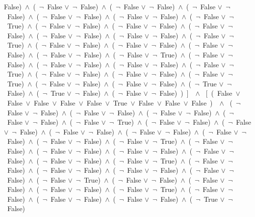 ﻿\documentclass[a4paper,10pt]{article}
\begin{document}
False)\ $\wedge$\ (\  $\neg$\ False $\vee$\  $\neg$\ False)\ $\wedge$\ (\  $\neg$\ False $\vee$\  $\neg$\ False)\ $\wedge$\ (\  $\neg$\ False $\vee$\  $\neg$\ False)\ $\wedge$\ (\  $\neg$\ False $\vee$\  $\neg$\ False)\ $\wedge$\ (\  $\neg$\ False $\vee$\  $\neg$\ False)\ $\wedge$\ (\  $\neg$\ False $\vee$\  $\neg$\ True)\ $\wedge$\ (\  $\neg$\ False $\vee$\  $\neg$\ False)\ $\wedge$\ (\  $\neg$\ False $\vee$\  $\neg$\ False)\ $\wedge$\ (\  $\neg$\ False $\vee$\  $\neg$\ False)\ $\wedge$\ (\  $\neg$\ False $\vee$\  $\neg$\ False)\ $\wedge$\ (\  $\neg$\ False $\vee$\  $\neg$\ False)\ $\wedge$\ (\  $\neg$\ False $\vee$\  $\neg$\ True)\ $\wedge$\ (\  $\neg$\ False $\vee$\  $\neg$\ False)\ $\wedge$\ (\  $\neg$\ False $\vee$\  $\neg$\ False)\ $\wedge$\ (\  $\neg$\ False $\vee$\  $\neg$\ False)\ $\wedge$\ (\  $\neg$\ False $\vee$\  $\neg$\ False)\ $\wedge$\ (\  $\neg$\ False $\vee$\  $\neg$\ True)\ $\wedge$\ (\  $\neg$\ False $\vee$\  $\neg$\ False)\ $\wedge$\ (\  $\neg$\ False $\vee$\  $\neg$\ False)\ $\wedge$\ (\  $\neg$\ False $\vee$\  $\neg$\ False)\ $\wedge$\ (\  $\neg$\ False $\vee$\  $\neg$\ True)\ $\wedge$\ (\  $\neg$\ False $\vee$\  $\neg$\ False)\ $\wedge$\ (\  $\neg$\ False $\vee$\  $\neg$\ False)\ $\wedge$\ (\  $\neg$\ False $\vee$\  $\neg$\ True)\ $\wedge$\ (\  $\neg$\ False $\vee$\  $\neg$\ False)\ $\wedge$\ (\  $\neg$\ False $\vee$\  $\neg$\ False)\ $\wedge$\ (\  $\neg$\ True $\vee$\  $\neg$\ False)\ $\wedge$\ (\  $\neg$\ True $\vee$\  $\neg$\ False)\ $\wedge$\ (\  $\neg$\ False $\vee$\  $\neg$\ False)\ )\ ]\ \ $\wedge$ \ [\ (\ False\ $\vee$\ False\ $\vee$\ False\ $\vee$\ False\ $\vee$\ False\ $\vee$\ True\ $\vee$\ False\ $\vee$\ False\ $\vee$\ False\ )\ \ $\wedge$ \ (\  $\neg$\ False $\vee$\  $\neg$\ False)\ $\wedge$\ (\  $\neg$\ False $\vee$\  $\neg$\ False)\ $\wedge$\ (\  $\neg$\ False $\vee$\  $\neg$\ False)\ $\wedge$\ (\  $\neg$\ False $\vee$\  $\neg$\ False)\ $\wedge$\ (\  $\neg$\ False $\vee$\  $\neg$\ True)\ $\wedge$\ (\  $\neg$\ False $\vee$\  $\neg$\ False)\ $\wedge$\ (\  $\neg$\ False $\vee$\  $\neg$\ False)\ $\wedge$\ (\  $\neg$\ False $\vee$\  $\neg$\ False)\ $\wedge$\ (\  $\neg$\ False $\vee$\  $\neg$\ False)\ $\wedge$\ (\  $\neg$\ False $\vee$\  $\neg$\ False)\ $\wedge$\ (\  $\neg$\ False $\vee$\  $\neg$\ False)\ $\wedge$\ (\  $\neg$\ False $\vee$\  $\neg$\ True)\ $\wedge$\ (\  $\neg$\ False $\vee$\  $\neg$\ False)\ $\wedge$\ (\  $\neg$\ False $\vee$\  $\neg$\ False)\ $\wedge$\ (\  $\neg$\ False $\vee$\  $\neg$\ False)\ $\wedge$\ (\  $\neg$\ False $\vee$\  $\neg$\ False)\ $\wedge$\ (\  $\neg$\ False $\vee$\  $\neg$\ False)\ $\wedge$\ (\  $\neg$\ False $\vee$\  $\neg$\ True)\ $\wedge$\ (\  $\neg$\ False $\vee$\  $\neg$\ False)\ $\wedge$\ (\  $\neg$\ False $\vee$\  $\neg$\ False)\ $\wedge$\ (\  $\neg$\ False $\vee$\  $\neg$\ False)\ $\wedge$\ (\  $\neg$\ False $\vee$\  $\neg$\ False)\ $\wedge$\ (\  $\neg$\ False $\vee$\  $\neg$\ True)\ $\wedge$\ (\  $\neg$\ False $\vee$\  $\neg$\ False)\ $\wedge$\ (\  $\neg$\ False $\vee$\  $\neg$\ False)\ $\wedge$\ (\  $\neg$\ False $\vee$\  $\neg$\ False)\ $\wedge$\ (\  $\neg$\ False $\vee$\  $\neg$\ True)\ $\wedge$\ (\  $\neg$\ False $\vee$\  $\neg$\ False)\ $\wedge$\ (\  $\neg$\ False $\vee$\  $\neg$\ False)\ $\wedge$\ (\  $\neg$\ False $\vee$\  $\neg$\ False)\ $\wedge$\ (\  $\neg$\ True $\vee$\  $\neg$\ False)\ 
\end{document}
